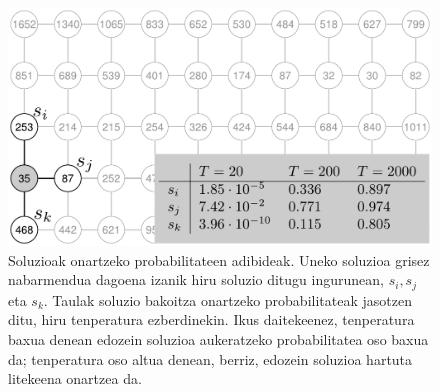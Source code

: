 \documentclass[eu]{ifirak}\usepackage[]{graphicx}\usepackage[]{color}
\begin{document}
\begin{figure}[t]
\centering
\includegraphics[width=0.66\linewidth]{./Irudiak/example_boltzman_dist}
\caption{Soluzioak onartzeko probabilitateen adibideak. Uneko soluzioa grisez nabarmendua dagoena izanik hiru soluzio ditugu ingurunean, $s_i,s_j$ eta $s_k$. Taulak soluzio bakoitza onartzeko probabilitateak jasotzen ditu, hiru tenperatura ezberdinekin. Ikus daitekeenez, tenperatura baxua denean edozein soluzioa aukeratzeko probabilitatea oso baxua da; tenperatura oso altua denean, berriz, edozein soluzioa hartuta litekeena onartzea da.}
\label{fig:example_boltzman_dist}
\end{figure}
\end{document}
